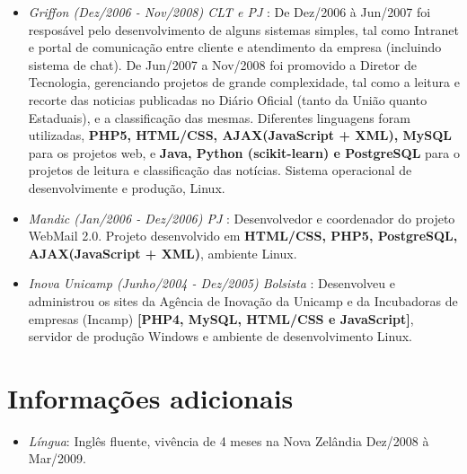 \documentclass[a4paper,10pt]{article}
\begin{document}
\begin{itemize}
\item \emph{Griffon (Dez/2006 - Nov/2008) CLT e PJ }: De Dez/2006 à Jun/2007 foi resposável pelo desenvolvimento de alguns sistemas simples, tal como Intranet e portal de comunicação entre cliente e atendimento da empresa (incluindo sistema de chat). De Jun/2007 a Nov/2008 foi promovido a Diretor de Tecnologia, gerenciando projetos de grande complexidade, tal como a leitura e recorte das noticias publicadas no Diário Oficial (tanto da União quanto Estaduais), e a classificação das mesmas. Diferentes linguagens foram utilizadas, \textbf{PHP5, HTML/CSS, AJAX(JavaScript + XML), MySQL} para os projetos web, e \textbf{Java, Python (scikit-learn) e PostgreSQL} para o projetos de leitura e classificação das notícias. Sistema operacional de desenvolvimente e produção, Linux.

\item \emph{Mandic (Jan/2006 - Dez/2006) PJ }: Desenvolvedor e coordenador do projeto WebMail 2.0. Projeto desenvolvido em \textbf{HTML/CSS, PHP5, PostgreSQL, AJAX(JavaScript + XML)}, ambiente Linux.
  
\item \emph{Inova Unicamp (Junho/2004 - Dez/2005) Bolsista }: Desenvolveu e administrou os sites da Agência de Inovação da Unicamp e da Incubadoras de empresas (Incamp) \textbf{[PHP4, MySQL, HTML/CSS e JavaScript]}, servidor de produção Windows e ambiente de desenvolvimento Linux.

\end{itemize}
\section{Informações adicionais}
\begin{itemize}
\item \emph{Língua}: Inglês fluente, vivência de 4 meses na Nova Zelândia Dez/2008 à Mar/2009.
\end{itemize}
\end{document}
